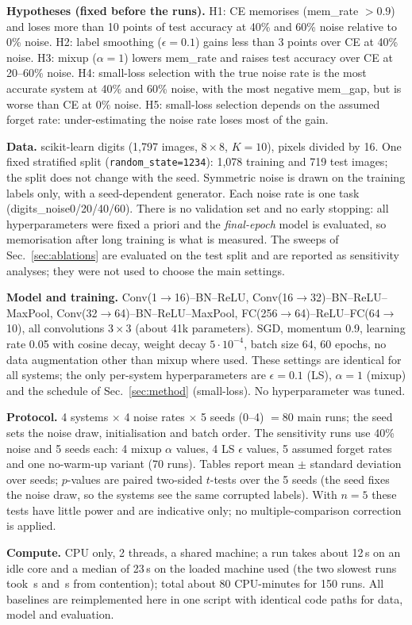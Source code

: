 \textbf{Hypotheses (fixed before the runs).} H1: CE memorises (mem\_rate $>0.9$) and loses more than 10 points of test accuracy at 40\% and 60\% noise relative to 0\% noise. H2: label smoothing ($\epsilon{=}0.1$) gains less than 3 points over CE at 40\% noise. H3: mixup ($\alpha{=}1$) lowers mem\_rate and raises test accuracy over CE at 20--60\% noise. H4: small-loss selection with the true noise rate is the most accurate system at 40\% and 60\% noise, with the most negative mem\_gap, but is worse than CE at 0\% noise. H5: small-loss selection depends on the assumed forget rate: under-estimating the noise rate loses most of the gain.

\textbf{Data.} scikit-learn digits (1,797 images, $8{\times}8$, $K{=}10$), pixels divided by 16. One fixed stratified split (\texttt{random\_state=1234}): 1,078 training and 719 test images; the split does not change with the seed. Symmetric noise is drawn on the training labels only, with a seed-dependent generator. Each noise rate is one task (digits\_noise0/20/40/60). There is no validation set and no early stopping: all hyperparameters were fixed a priori and the \emph{final-epoch} model is evaluated, so memorisation after long training is what is measured. The sweeps of Sec.~\ref{sec:ablations} are evaluated on the test split and are reported as sensitivity analyses; they were not used to choose the main settings.

\textbf{Model and training.} Conv(1$\to$16)--BN--ReLU, Conv(16$\to$32)--BN--ReLU--MaxPool, Conv(32$\to$64)--BN--ReLU--MaxPool, FC(256$\to$64)--ReLU--FC(64$\to$10), all convolutions $3{\times}3$ (about 41k parameters). SGD, momentum 0.9, learning rate 0.05 with cosine decay, weight decay $5\cdot10^{-4}$, batch size 64, 60 epochs, no data augmentation other than mixup where used. These settings are identical for all systems; the only per-system hyperparameters are $\epsilon{=}0.1$ (LS), $\alpha{=}1$ (mixup) and the schedule of Sec.~\ref{sec:method} (small-loss). No hyperparameter was tuned.

\textbf{Protocol.} 4 systems $\times$ 4 noise rates $\times$ 5 seeds (0--4) $=80$ main runs; the seed sets the noise draw, initialisation and batch order. The sensitivity runs use 40\% noise and 5 seeds each: 4 mixup $\alpha$ values, 4 LS $\epsilon$ values, 5 assumed forget rates and one no-warm-up variant (70 runs). Tables report mean $\pm$ standard deviation over seeds; $p$-values are paired two-sided $t$-tests over the 5 seeds (the seed fixes the noise draw, so the systems see the same corrupted labels). With $n{=}5$ these tests have little power and are indicative only; no multiple-comparison correction is applied.

\textbf{Compute.} CPU only, 2 threads, a shared machine; a run takes about 12\,s on an idle core and a median of 23\,s on the loaded machine used (the two slowest runs took \,s and \,s from contention); total about 80 CPU-minutes for 150 runs. All baselines are reimplemented here in one script with identical code paths for data, model and evaluation.
